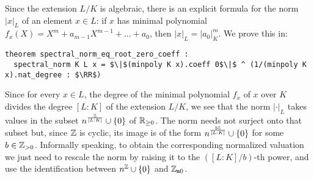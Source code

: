 \documentclass[sigplan,10pt,anonymous,review]{acmart}
\begin{document}
Since the extension $L/K$ is algebraic, there is an explicit formula for the norm $\lvert x\rvert_L$ of an element $x \in L$: if $x$ has minimal polynomial $f_x(X) = X^m + a_{m-1}X^{m-1} + \dots + a_0$, then $\lvert x\rvert _L = \lvert a_0\rvert _K^m$. We prove this in\href{https://github.com/LCFT-Lean/local_fields/blob/76ad487d09babdb0018f394a5634526637ee014a/src/spectral_norm.lean#L166}{\extlink}:

\begin{lstlisting}
theorem spectral_norm_eq_root_zero_coeff :
  spectral_norm K L x = $\|$(minpoly K x).coeff 0$\|$ ^ (1/(minpoly K x).nat_degree : $\RR$)
\end{lstlisting}

Since for every $x \in L$, the degree of the minimal polynomial $f_x$ of $x$ over $K$ divides the degree $[L : K]$ of the extension $L/K$\href{https://github.com/LCFT-Lean/local_fields/blob/76ad487d09babdb0018f394a5634526637ee014a/src/for_mathlib/field_theory/minpoly/is_integrally_closed.lean#L26}{\extlink}, we see that the norm $\lvert\cdot\rvert_L$ takes values in the subset $n^{\frac{\mathbb{Z}}{[L : K]}} \cup \{0\}$ of $\mathbb{R}_{\ge 0}$. The norm needs not surject onto that subset but, since $\mathbb{Z}$ is cyclic, its image is of the form $n^{\frac{b\mathbb{Z}}{[L : K]}} \cup \{0\}$ for some $b \in \mathbb{Z}_{>0}$. Informally speaking, to obtain the corresponding normalized valuation we just need to rescale the norm by raising it to the $([L:K]/b)$-th power, and use the identification between $n^{\mathbb{Z}} \cup \{0\}$ and $\mathbb{Z}_{\mathtt{m}0}$.
\end{document}
